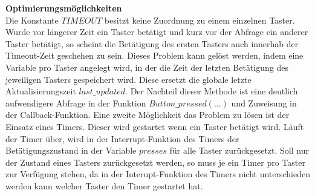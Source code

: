 \newline
\textbf{Optimierungsmöglichkeiten}\\
Die Konstante $TIMEOUT$ besitzt keine Zuordnung zu einem einzelnen Taster. Wurde vor längerer Zeit ein Taster betätigt und kurz vor der Abfrage ein anderer Taster betätigt, so scheint die Betätigung des ersten Tasters auch innerhab der Timeout-Zeit geschehen zu sein. Dieses Problem kann gelöst werden, indem eine Variable pro Taster angelegt wird, in der die Zeit der letzten Betätigung des jeweiligen Tasters gespeichert wird. Diese ersetzt die globale letzte Aktualisierungszeit $last\_updated$. Der Nachteil dieser Methode ist eine deutlich aufwendigere Abfrage in der Funktion $Button\_pressed(...)$ und Zuweisung in der Callback-Funktion. Eine zweite Möglichkeit das Problem zu lösen ist der Einsatz eines Timers. Dieser wird gestartet wenn ein Taster betätigt wird. Läuft der Timer über, wird in der Interrupt-Funktion des Timers der Betätigungszustand in der Variable $presses$ für alle Taster zurückgesetzt. Soll nur der Zustand eines Tasters zurückgesetzt werden, so muss je ein Timer pro Taster zur Verfügung stehen, da in der Interupt-Funktion des Timers nicht unterschieden werden kann welcher Taster den Timer gestartet hat.